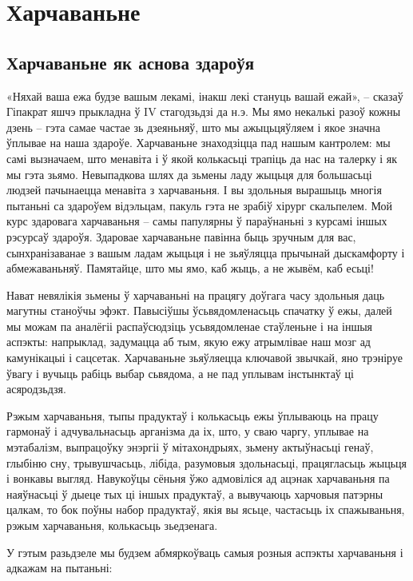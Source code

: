 \chapter{Харчаваньне}

\section{Харчаваньне як аснова здароўя}

«Няхай ваша ежа будзе вашым лекамі, інакш лекі стануць вашай ежай», – сказаў Гіпакрат яшчэ прыкладна ў IV стагодзьдзі да н.э. Мы ямо некалькі разоў кожны дзень – гэта самае частае зь дзеяньняў, што мы ажыцьцяўляем і якое значна ўплывае на наша здароўе. Харчаваньне знаходзіцца пад нашым кантролем: мы самі вызначаем, што менавіта і ў якой колькасьці трапіць да нас на талерку і як мы гэта зьямо. Невыпадкова шлях да зьмены ладу жыцьця для большасьці людзей пачынаецца менавіта з харчаваньня. І вы здольныя вырашыць многія пытаньні са здароўем відэльцам, пакуль гэта не зрабіў хірург скальпелем. Мой курс здаровага харчаваньня – самы папулярны ў параўнаньні з курсамі іншых рэсурсаў здароўя. Здаровае харчаваньне павінна быць зручным для вас, сынхранізаванае з вашым ладам жыцьця і не зьяўляцца прычынай дыскамфорту і абмежаваньняў. Памятайце, што мы ямо, каб жыць, а не жывём, каб есьці!

Нават невялікія зьмены ў харчаваньні на працягу доўгага часу здольныя даць магутны станоўчы эфэкт. Павысіўшы ўсьвядомленасьць спачатку ў ежы, далей мы можам па аналёгіі распаўсюдзіць усьвядомленае стаўленьне і на іншыя аспэкты: напрыклад, задумацца аб тым, якую ежу атрымлівае наш мозг ад камунікацыі і сацсетак. Харчаваньне зьяўляецца ключавой звычкай, яно трэніруе ўвагу і вучыць рабіць выбар сьвядома, а не пад уплывам інстынктаў ці асяродзьдзя.

Рэжым харчаваньня, тыпы прадуктаў і колькасьць ежы ўплываюць на працу гармонаў і адчувальнасьць арганізма да іх, што, у сваю чаргу, уплывае на мэтабалізм, выпрацоўку энэргіі ў мітахондрыях, зьмену актыўнасьці генаў, глыбіню сну, трывушчасьць, лібіда, разумовыя здольнасьці, працягласьць жыцьця і вонкавы выгляд. Навукоўцы сёньня ўжо адмовіліся ад ацэнак харчаваньня па наяўнасьці ў дыеце тых ці іншых прадуктаў, а вывучаюць харчовыя патэрны цалкам, то бок поўны набор прадуктаў, якія вы ясьце, частасьць іх спажываньня, рэжым харчаваньня, колькасьць зьедзенага.

У гэтым разьдзеле мы будзем абмяркоўваць самыя розныя аспэкты харчаваньня і адкажам на пытаньні: 

